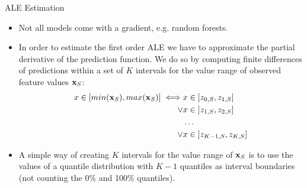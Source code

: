 \begin{vbframe}{ALE Estimation}

\begin{itemize}
  \item Not all models come with a gradient, e.g. random forests.
  \item In order to estimate the first order ALE we have to approximate the partial derivative of the prediction function. We do so by computing finite differences of predictions within a set of $K$ intervals for the value range of observed feature values $\xv_S$:
  $$
  \begin{aligned}
  x \in [min(\xv_S), max(\xv_S)] \iff &x \in [z_{0, S}, z_{1, S}] \\
  \lor &x \in \; ]z_{1, S}, z_{2, S}] \\
  &\dots \\
  \lor &x \in \; ]z_{K-1, S}, z_{K, S}]
  \end{aligned}
  $$
  \item A simple way of creating $K$ intervals for the value range of $\xv_S$ is to use the values of a quantile distribution with $K-1$ quantiles as interval boundaries (not counting the 0\% and 100\% quantiles).
\end{itemize}

\end{vbframe}

